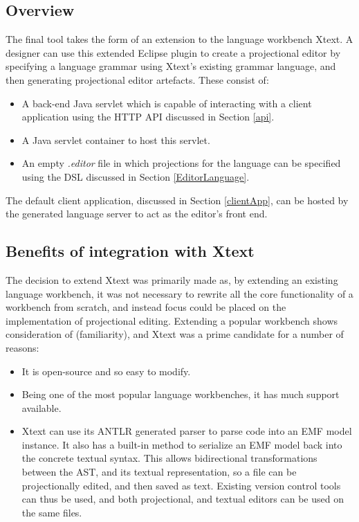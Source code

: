 \documentclass{article}
\begin{document}
\subsection{Overview}

The final tool takes the form of an extension to the language workbench Xtext. A designer can use this extended Eclipse plugin to create a projectional editor by specifying a language grammar using Xtext's existing grammar language, and then generating projectional editor artefacts. These consist of:
\begin{itemize}
\item A back-end Java servlet which is capable of interacting with a client application using the HTTP API discussed in Section \ref{api}.
\item A Java servlet container to host this servlet.
\item An empty \emph{.editor} file in which projections for the language can be specified using the DSL discussed in Section \ref{EditorLanguage}. 
\end{itemize}
%
The default client application, discussed in Section \ref{clientApp}, can be hosted by the generated language server to act as the editor's front end. 

\subsection{Benefits of integration with Xtext}\label{integrationWithXtext}
The decision to extend Xtext was primarily made as, by extending an existing language workbench, it was not necessary to rewrite all the core functionality of a workbench from scratch, and instead focus could be placed on the implementation of projectional editing. Extending a popular workbench shows consideration of \RFamiliarity (familiarity), and Xtext was a prime candidate for a number of reasons:
\begin{itemize}
\item It is open-source and so easy to modify.
\item Being one of the most popular language workbenches, it has much support available.
\item Xtext can use its ANTLR generated parser to parse code into an EMF model instance. It also has a built-in method to serialize an EMF model back into the concrete textual syntax. This allows bidirectional transformations between the AST, and its textual representation, so a file can be projectionally edited, and then saved as text. Existing version control tools can thus be used, and both projectional, and textual editors can be used on the same files.
\end{itemize}
\end{document}
